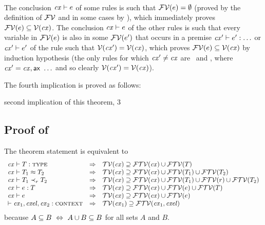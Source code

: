 \begin{bycase}
\Case{\Rthsub}
\begin{derivation}
\steP{\efvar{\app{\tspred}{\expr}}=\efvar{\tspred}\cup\efvar{\expr}}
\step{\hastyO{\expr}{\typ}}{\premof{\Rthsub}}
\end{derivation}

\Case{\restrules}\\
The conclusion $\mathit{cx}\vdash e$ of some rules is such that
$\mathcal{FV}(e)=\emptyset$ (proved by the definition of $\mathcal{FV}$ and in some
cases by ), which immediately proves
$\mathcal{FV}(e)\subseteq\mathcal{V}(\mathit{cx})$. The conclusion $\mathit{cx}\vdash e$ of the
other rules is such that every variable in $\mathcal{FV}(e)$ is also in some
$\mathcal{FV}(e')$ that occurs in a premise $\mathit{cx}'\vdash e':\ldots$ or
$\mathit{cx}'\vdash e'$ of the rule such that $\mathcal{V}(\mathit{cx}')=\mathcal{V}(\mathit{cx})$, which
proves $\mathcal{FV}(e)\subseteq\mathcal{V}(\mathit{cx})$ by induction hypothesis (the only rules
for which $\mathit{cx}'\neq\mathit{cx}$ are \Rthifsbs\ and \Rthif, where
$\mathit{cx}'=\mathit{cx},\mathsf{ax}\ \ldots$ and so clearly $\mathcal{V}(\mathit{cx}')=\mathcal{V}(\mathit{cx})$).

\end{bycase}

The fourth implication is proved as follows:
\begin{derivation}
     {second implication of this theorem, 3}
\end{derivation}



\subsection*{Proof of }

The theorem statement is equivalent to
\[
\begin{array}{l@{\ \ \IMPLIES\ \ }l}
\istyO{\typ} &
 \cxtvarO\supseteq\ftvar{\cx}\cup\ftvar{\typ} \\
\teqO{\typ_1}{\typ_2} &
 \cxtvarO\supseteq\ftvar{\cx}\cup\ftvar{\typ_1}\cup\ftvar{\typ_2} \\
\issubO{\typ_1}{\tspred}{\typ_2} &
 \cxtvarO\supseteq
  \ftvar{\cx}\cup\ftvar{\typ_1}\cup\ftvar{\tspred}\cup\ftvar{\typ_2} \\
\hastyO{\expr}{\typ} &
 \cxtvarO\supseteq\ftvar{\cx}\cup\ftvar{\expr}\cup\ftvar{\typ} \\
\theoO{\expr} &
 \cxtvarO\supseteq\ftvar{\cx}\cup\ftvar{\expr} \\
\cxwf{\cx_1,\cxel,\cx_2} &
 \cxtvar{\cx_1}\supseteq\ftvar{\cx_1,\cxel}
\end{array}
\]
because $A \subseteq B \ \Leftrightarrow\  A \cup B \subseteq B$ for all sets $A$ and $B$.


